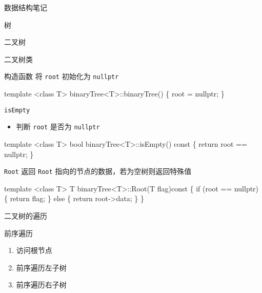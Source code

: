 \documentclass[
  ignorenonframetext,
]{beamer}
\newenvironment{Shaded}{}{}
\newcommand{\NormalTok}[1]{#1}
\providecommand{\tightlist}{%
  \setlength{\itemsep}{0pt}\setlength{\parskip}{0pt}}
\begin{document}
\begin{frame}[fragile]{数据结构笔记}
\begin{block}{树}
\begin{block}{二叉树}
\begin{block}{二叉树类}
\begin{block}{构造函数}
\protect{}\label{ux6784ux9020ux51fdux6570-7}
将 \texttt{root} 初始化为 \texttt{nullptr}

\begin{Shaded}
\begin{Highlighting}[]
\NormalTok{template \textless{}class T\textgreater{}}
\NormalTok{binaryTree\textless{}T\textgreater{}::binaryTree()}
\NormalTok{\{}
\NormalTok{  root = nullptr;}
\NormalTok{\}}
\end{Highlighting}
\end{Shaded}
\end{block}

\begin{block}{\texttt{isEmpty}}
\protect{}\label{isempty-4}
\begin{itemize}
\tightlist
\item
  判断 \texttt{root} 是否为 \texttt{nullptr}
\end{itemize}

\begin{Shaded}
\begin{Highlighting}[]
\NormalTok{template \textless{}class T\textgreater{}}
\NormalTok{bool binaryTree\textless{}T\textgreater{}::isEmpty() const}
\NormalTok{\{}
\NormalTok{  return root == nullptr;}
\NormalTok{\}}
\end{Highlighting}
\end{Shaded}
\end{block}

\begin{block}{\texttt{Root}}
\protect{}\label{root}
返回 \texttt{Root} 指向的节点的数据，若为空树则返回特殊值

\begin{Shaded}
\begin{Highlighting}[]
\NormalTok{template \textless{}class T\textgreater{}}
\NormalTok{T binaryTree\textless{}T\textgreater{}::Root(T flag)const}
\NormalTok{\{}
\NormalTok{  if (root == nullptr)}
\NormalTok{  \{}
\NormalTok{    return flag;}
\NormalTok{  \}}
\NormalTok{  else}
\NormalTok{  \{}
\NormalTok{    return root{-}\textgreater{}data;}
\NormalTok{  \}}
\NormalTok{\}}
\end{Highlighting}
\end{Shaded}
\end{block}

\begin{block}{二叉树的遍历}
\protect{}\label{ux4e8cux53c9ux6811ux7684ux904dux5386-1}
\begin{block}{前序遍历}
\protect{}\label{ux524dux5e8fux904dux5386-1}
\begin{enumerate}
\tightlist
\item
  访问根节点
\item
  前序遍历左子树
\item
  前序遍历右子树
\end{enumerate}


\end{block}
\end{block}
\end{block}
\end{block}
\end{block}
\end{frame}
\end{document}
